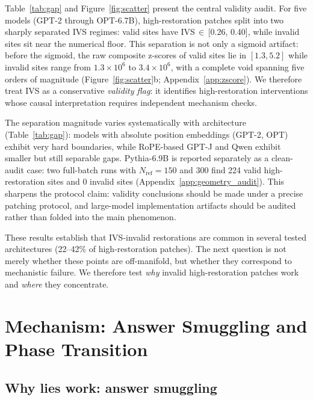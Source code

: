 \documentclass{article}
\begin{document}
Table~\ref{tab:gap} and Figure~\ref{fig:scatter} present the central validity audit. For five models (GPT-2 through OPT-6.7B), high-restoration patches split into two sharply separated IVS regimes: valid sites have IVS\,$\in$\,[0.26, 0.40], while invalid sites sit near the numerical floor. This separation is not only a sigmoid artifact: before the sigmoid, the raw composite z-scores of valid sites lie in $[1.3, 5.2]$ while invalid sites range from $1.3{\times}10^{6}$ to $3.4{\times}10^{6}$, with a complete void spanning five orders of magnitude (Figure~\ref{fig:scatter}b; Appendix~\ref{app:zscore}). We therefore treat IVS as a conservative \emph{validity flag}: it identifies high-restoration interventions whose causal interpretation requires independent mechanism checks.

The separation magnitude varies systematically with architecture (Table~\ref{tab:gap}): models with absolute position embeddings (GPT-2, OPT) exhibit very hard boundaries, while RoPE-based GPT-J and Qwen exhibit smaller but still separable gaps. Pythia-6.9B is reported separately as a clean-audit case: two full-batch runs with $N_\text{ref}=150$ and 300 find 224 valid high-restoration sites and 0 invalid sites (Appendix~\ref{app:geometry_audit}). This sharpens the protocol claim: validity conclusions should be made under a precise patching protocol, and large-model implementation artifacts should be audited rather than folded into the main phenomenon.

These results establish that IVS-invalid restorations are common in several tested architectures (22--42\% of high-restoration patches). The next question is not merely whether these points are off-manifold, but whether they correspond to mechanistic failure. We therefore test \emph{why} invalid high-restoration patches work and \emph{where} they concentrate.

\section{Mechanism: Answer Smuggling and Phase Transition}
\label{sec:mechanism}

\subsection{Why lies work: answer smuggling}
\end{document}
